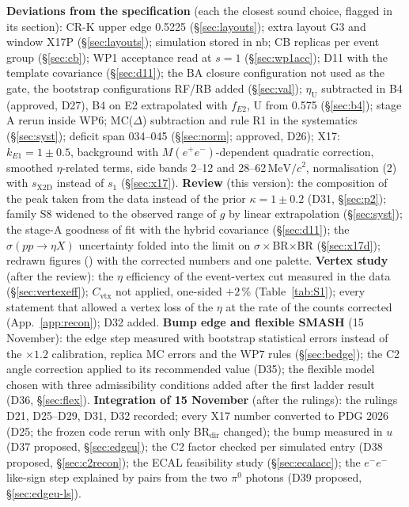 \documentclass[11pt,a4paper]{article}
\newcommand{\piz}{\ensuremath{\pi^{0}}\xspace}
\newcommand{\Mee}{\ensuremath{M(e^{+}e^{-})}\xspace}
\newcommand{\MeVcc}{\ensuremath{\mathrm{MeV}/c^{2}}\xspace}
\newcommand{\code}[1]{\texttt{\detokenize{#1}}}
\newcommand{\kEone}{\ensuremath{k_{E1}}\xspace}
\newcommand{\sigeta}{\ensuremath{\sigma(pp\to\eta X)}\xspace}
\begin{document}
\textbf{Deviations from the specification} (each the closest sound choice, flagged in its section): CR-K upper edge 0.5225 (\S\ref{sec:layouts});
extra layout G3 and window X17P (\S\ref{sec:layouts}); simulation stored in nb; CB replicas per event group (\S\ref{sec:cb}); WP1 acceptance
read at $s=1$ (\S\ref{sec:wp1acc}); D11 with the template covariance (\S\ref{sec:d11}); the BA closure configuration not used as the gate, the
bootstrap configurations RF/RB added (\S\ref{sec:val}); $\eta_{\mathrm{U}}$ subtracted in B4 (approved, D27), B4 on E2 extrapolated with $f_{E2}$, U from 0.575
(\S\ref{sec:b4}); stage A rerun inside WP6; MC($\Delta$) subtraction and rule R1 in the systematics (\S\ref{sec:syst}); deficit span 034--045
(\S\ref{sec:norm}; approved, D26); X17: $\kEone=1\pm0.5$, background with \Mee-dependent quadratic correction, smoothed $\eta$-related terms, side bands 2--12 and
28--62\,\MeVcc, normalisation (2) with $s_{\mathrm{X2D}}$ instead of $s_1$ (\S\ref{sec:x17}). \textbf{Review} (this version): the composition of the peak taken from the data instead of the prior $\kappa=1\pm0.2$ (D31,
\S\ref{sec:p2}); family S8 widened to the observed range of $g$ by linear extrapolation (\S\ref{sec:syst}); the stage-A goodness of fit with the
hybrid covariance (\S\ref{sec:d11}); the \sigeta uncertainty folded into the limit on $\sigma\times$BR$\times$BR (\S\ref{sec:x17d}); redrawn
figures (\code{fix_*}) with the corrected numbers and one palette. \textbf{Vertex study} (after the review): the $\eta$ efficiency of the
event-vertex cut measured in the data (\S\ref{sec:vertexeff}); $C_{\mathrm{vtx}}$ not applied, one-sided $+2$\,\% (Table~\ref{tab:S1}); every
statement that allowed a vertex loss of the $\eta$ at the rate of the counts corrected (App.~\ref{app:recon}); D32 added. \textbf{Bump edge and flexible SMASH}
(15 November): the edge step measured with bootstrap statistical errors instead of the $\times1.2$ calibration, replica MC errors and the WP7 rules
(\S\ref{sec:bedge}); the C2 angle correction applied to its recommended value (D35); the flexible model chosen with three admissibility conditions
added after the first ladder result (D36, \S\ref{sec:flex}). \textbf{Integration of 15 November} (after the rulings): the rulings D21,
D25--D29, D31, D32 recorded; every X17 number converted to PDG 2026 (D25; the frozen code rerun with only BR$_{\mathrm{dir}}$ changed); the bump
measured in $u$ (D37 proposed, \S\ref{sec:edgeu}); the C2 factor checked per simulated entry (D38 proposed, \S\ref{sec:c2recon}); the ECAL feasibility study
(\S\ref{sec:ecalacc}); the $e^-e^-$ like-sign step explained by pairs from the two \piz photons (D39 proposed, \S\ref{sec:edgeu-ls}).
\end{document}
